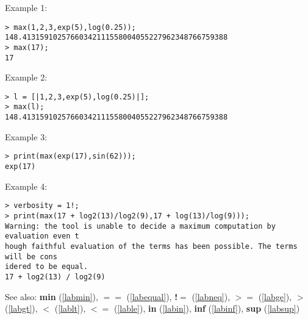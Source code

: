 \noindent Example 1: 
\begin{center}\begin{minipage}{15cm}\begin{Verbatim}[frame=single]
> max(1,2,3,exp(5),log(0.25));
148.41315910257660342111558004055227962348766759388
> max(17);
17
\end{Verbatim}
\end{minipage}\end{center}
\noindent Example 2: 
\begin{center}\begin{minipage}{15cm}\begin{Verbatim}[frame=single]
> l = [|1,2,3,exp(5),log(0.25)|];
> max(l);
148.41315910257660342111558004055227962348766759388
\end{Verbatim}
\end{minipage}\end{center}
\noindent Example 3: 
\begin{center}\begin{minipage}{15cm}\begin{Verbatim}[frame=single]
> print(max(exp(17),sin(62)));
exp(17)
\end{Verbatim}
\end{minipage}\end{center}
\noindent Example 4: 
\begin{center}\begin{minipage}{15cm}\begin{Verbatim}[frame=single]
> verbosity = 1!;
> print(max(17 + log2(13)/log2(9),17 + log(13)/log(9)));
Warning: the tool is unable to decide a maximum computation by evaluation even t
hough faithful evaluation of the terms has been possible. The terms will be cons
idered to be equal.
17 + log2(13) / log2(9)
\end{Verbatim}
\end{minipage}\end{center}
See also: \textbf{min} (\ref{labmin}), \textbf{$==$} (\ref{labequal}), \textbf{!$=$} (\ref{labneq}), \textbf{$>=$} (\ref{labge}), \textbf{$>$} (\ref{labgt}), \textbf{$<$} (\ref{lablt}), \textbf{$<=$} (\ref{lable}), \textbf{in} (\ref{labin}), \textbf{inf} (\ref{labinf}), \textbf{sup} (\ref{labsup})
